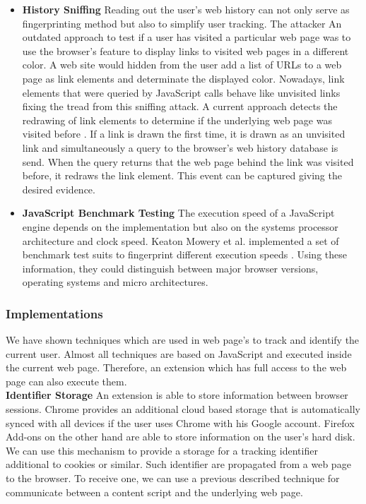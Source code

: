 \begin{itemize}
				\item \textbf{History Sniffing} Reading out the user's web history can not only serve as fingerprinting method but also to simplify user tracking. The attacker  An outdated approach to test if a user has visited a particular web page was to use the browser's feature to display links to visited web pages in a different color. A web site would hidden from the user add a list of URLs to a web page as link elements and determinate the displayed color. Nowadays, link elements that were queried by JavaScript calls behave like unvisited links fixing the tread from this sniffing attack. A current approach detects the redrawing of link elements to determine if the underlying web page was visited before \cite{paulstone_historysniffing}. If a link is drawn the first time, it is drawn as an unvisited link and simultaneously a query to the browser's web history database is send. When the query returns that the web page behind the link was visited before, it redraws the link element. This event can be captured giving the desired evidence.
				
				\item \textbf{JavaScript Benchmark Testing} The execution speed of a JavaScript engine depends on the implementation but also on the systems processor architecture and clock speed. Keaton Mowery et al. implemented a set of benchmark test suits to fingerprint different execution speeds \cite{MBYS11}. Using these information, they could distinguish between major browser versions, operating systems and micro architectures. 
			\end{itemize}
		
		\subsubsection{Implementations}
			
			We have shown techniques which are used in web page's to track and identify the current user. Almost all techniques are based on JavaScript and executed inside the current web page. Therefore, an extension which has full access to the web page can also execute them. \\
			
			\textbf{Identifier Storage} An extension is able to store information between browser sessions. Chrome provides an additional cloud based storage that is automatically synced with all devices if the user uses Chrome with his Google account. Firefox Add-ons on the other hand are able to store information on the user's hard disk. We can use this mechanism to provide a storage for a tracking identifier additional to cookies or similar. Such identifier are propagated from a web page to the browser. To receive one, we can use a previous described technique for communicate between a content script and the underlying web page. \\
			
